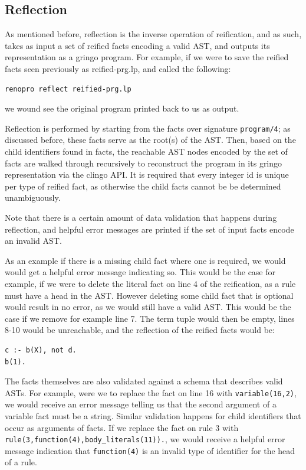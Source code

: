 \subsection{Reflection}

As mentioned before, reflection is the inverse operation of
reification, and as such, takes as input a set of reified facts
encoding a valid AST, and outputs its representation as a gringo
program. For example, if we were to save the reified facts seen
previously as reified-prg.lp, and called the following:

\begin{lstlisting}[language=bash,numbers=none]
renopro reflect reified-prg.lp
\end{lstlisting}

we wound see the original program printed back to us as output.

Reflection is performed by starting from the facts over signature
\texttt{program/4}; as discussed before, these facts serve as the
root(s) of the AST. Then, based on the child identifiers found in
facts, the reachable AST nodes encoded by the set of facts are walked
through recursively to reconstruct the program in its gringo
representation via the clingo API. It is required that every integer
id is unique per type of reified fact, as otherwise the child facts
cannot be be determined unambiguously.

Note that there is a certain amount of data validation that happens
during reflection, and helpful error messages are printed if the set
of input facts encode an invalid AST. 

As an example if there is a missing child fact where one is required,
we would would get a helpful error message indicating so. This would
be the case for example, if we were to delete the literal fact on line
4 of the reification, as a rule must have a head in the AST. However
deleting some child fact that is optional would result in no error, as
we would still have a valid AST. This would be the case if we remove
for example line 7. The term tuple would then be empty, lines 8-10
would be unreachable, and the reflection of the reified facts would
be:

\begin{lstlisting}[language=clingo]
c :- b(X), not d. 
b(1).
\end{lstlisting}

The facts themselves are also validated against a schema that
describes valid ASTs. For example, were we to replace the fact on line
16 with \texttt{variable(16,2)}, we would receive an error message
telling us that the second argument of a variable fact must be a
string. Similar validation happens for child identifiers that occur as
arguments of facts. If we replace the fact on rule 3 with
\texttt{rule(3,function(4),body\_literals(11)).}, we would receive a
helpful error message indication that \texttt{function(4)} is an
invalid type of identifier for the head of a rule.

